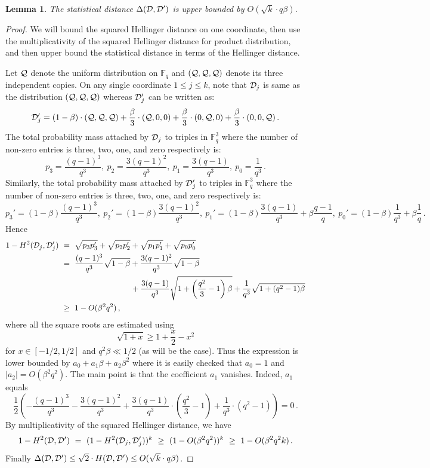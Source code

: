 \documentclass[10pt]{article}
\newtheorem{lemma}[theorem]{Lemma}
\theoremstyle{definition}
\numberwithin{equation}{section}
\newcommand\F{\mathbb{F}}
\begin{document}
\begin{lemma}\label{lemma:covering}  The statistical distance
$\Delta( {\cal D}, {\cal D'} )$ is upper bounded by $O(\sqrt{k}\cdot q\beta)$.
\end{lemma}
\begin{proof} We will bound the squared Hellinger distance on one coordinate, then
use the multiplicativity of the squared Hellinger distance for product distribution,
and then upper bound the statistical distance in terms of the Hellinger distance.

Let ${\cal Q}$ denote the uniform distribution on $\F_q$ and $({\cal Q}, {\cal Q}, {\cal Q})$
denote its three independent copies.
On any single coordinate $1 \leq j \leq k$,
note that ${\cal D}_j$ is same as the distribution $({\cal Q}, {\cal Q}, {\cal Q})$ whereas
${\cal D}'_j$ can be written as:
 $$ {\cal D}'_j = (1-\beta)\cdot ({\cal Q}, {\cal Q}, {\cal Q})+ \frac{\beta}{3} \cdot
 ({\cal Q}, 0, 0) + \frac{\beta}{3}\cdot (0, {\cal Q}, 0)+ \frac{\beta}{3} \cdot
 (0,0, {\cal Q})\,. $$
The total probability mass attached by ${\cal D}_j$ to triples in $\F_q^3$ where the
number of non-zero entries is three, two, one, and zero respectively is:
$$ p_3=\frac{(q-1)^3}{q^3}, \ p_2= \frac{3(q-1)^2}{q^3}, \ p_1=\frac{3(q-1)}{q^3}, \ p_0=\frac{1}{q^3}\,. $$
Similarly, the total probability mass attached by ${\cal D}'_j$ to triples in $\F_q^3$ where the
number of non-zero entries is three, two, one, and zero respectively is:
$$ p_3'=(1-\beta)\frac{(q-1)^3}{q^3}, \ p_2'=(1-\beta)\frac{3(q-1)^2}{q^3}, \ p_1'=(1-\beta)\frac{3(q-1)}{q^3}+
\beta \frac{q-1}{q}, \ p_0'=(1-\beta)\frac{1}{q^3}+ \beta \frac{1}{q}\,. $$
Hence
\begin{align*}
  1 - H^2({\cal D}_j, {\cal D}'_j )\
  &=\  \sqrt{p_3 p_3'} + \sqrt{p_2 p_2'} + \sqrt{p_1 p_1'} + \sqrt{p_0 p_0'} \\
  &=\  \frac{(q-1)^3}{q^3} \sqrt{1-\beta} + \frac{3(q-1)^2}{q^3}
  \sqrt{1-\beta}\\
  &\phantom{=\ \frac{(q-1)^3}{q^3} \sqrt{1-\beta}\ } +
  \frac{3(q-1)}{q^3} \sqrt{1+ \left(\frac{q^2}{3}-1\right)\beta} + \frac{1}{q^3} \sqrt{1+ (q^2-1)\beta} \\
  &\geq\ 1- O(\beta^2 q^2)\,,
\end{align*}
where all the square roots are estimated using
\[
\sqrt{1+x} \geq 1+\frac{x}{2}-x^2
\]
 for $x \in
[-{1}/{2},{1}/{2}]$
and $q^2 \beta \ll {1}/{2}$ (as will be the case). Thus the expression is
lower bounded by $a_0 + a_1 \beta + a_2 \beta^2$ where it is easily checked that
$a_0 =1 $ and $|a_2| = O(\beta^2 q^2)$.
The main point is that the coefficient $a_1$ vanishes. Indeed, $a_1$ equals
$$ \frac{1}{2} \left( - \frac{(q-1)^3}{q^3} -  \frac{3(q-1)^2}{q^3}
+  \frac{3(q-1)}{q^3} \cdot \left(\frac{q^2}{3}-1\right) +  \frac{1}{q^3} \cdot
  (q^2-1)  \right)   = 0\,.  $$
%
%
%
%
By multiplicativity of the squared Hellinger distance, we have
 $$ 1- H^2({\cal D}, {\cal D}') \ = \ (1- H^2({\cal D}_j, {\cal D}'_j))^{k}
 \ \geq \
 (1-O(\beta^2 q^2))^{k} \ \geq \ 1-O(\beta^2 q^2k)\,.$$
Finally $\Delta({\cal D}, {\cal D}') \leq  \sqrt{2} \cdot
 H({\cal D}, {\cal D}') \leq O(\sqrt{k} \cdot q\beta)$.
\end{proof}
\end{document}
